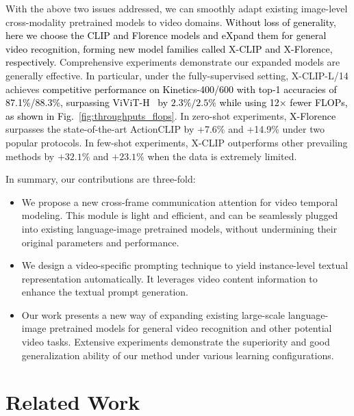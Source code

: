 \documentclass[runningheads]{llncs}
\begin{document}
With the above two issues addressed, we can smoothly adapt existing image-level cross-modality pretrained models to video domains. \textcolor{black}{Without loss of generality, here we choose the CLIP \cite{clip} and Florence \cite{florence} models and eXpand them for general video recognition, forming new model families called X-CLIP and X-Florence, respectively.} Comprehensive experiments demonstrate our expanded models are generally effective. In particular, under the fully-supervised setting, X-CLIP-L/14 achieves \textcolor{black}{competitive performance on Kinetics-400/600 with top-1 accuracies of 87.1\%/88.3\%, surpassing ViViT-H~\cite{arnab2021vivit} by $2.3\%/2.5\%$ while using 12× fewer FLOPs, as shown in Fig.~\ref{fig:throughputs_flops}}. In zero-shot experiments, \textcolor{black}{X-Florence} surpasses the state-of-the-art ActionCLIP \cite{wang2021actionclip} by +7.6\% and +14.9\% under two popular protocols. In few-shot experiments, X-CLIP outperforms other prevailing methods by $+32.1\%$ and $+23.1\%$ when the data is extremely limited.

In summary, our contributions are three-fold: 
\begin{itemize}
    \item We propose a new cross-frame communication attention for video temporal modeling. This module is light and efficient, and can be seamlessly plugged into existing language-image pretrained models, without undermining their original parameters and performance.
    \item We design a video-specific  prompting technique to yield instance-level textual representation automatically. It leverages video content information to enhance the textual prompt generation. 
    \item Our work presents a new way of expanding existing large-scale language-image pretrained models for general video recognition and other potential video tasks. Extensive experiments demonstrate the superiority and good generalization ability of our method under various learning configurations. 
\end{itemize}

\section{Related Work}
\end{document}
